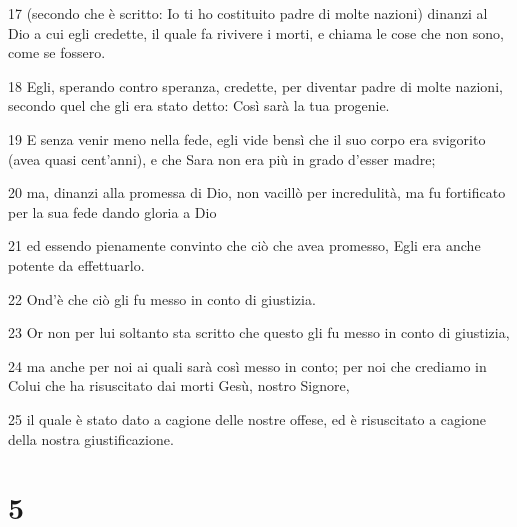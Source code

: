 \par 17 (secondo che è scritto: Io ti ho costituito padre di molte nazioni) dinanzi al Dio a cui egli credette, il quale fa rivivere i morti, e chiama le cose che non sono, come se fossero.
\par 18 Egli, sperando contro speranza, credette, per diventar padre di molte nazioni, secondo quel che gli era stato detto: Così sarà la tua progenie.
\par 19 E senza venir meno nella fede, egli vide bensì che il suo corpo era svigorito (avea quasi cent'anni), e che Sara non era più in grado d'esser madre;
\par 20 ma, dinanzi alla promessa di Dio, non vacillò per incredulità, ma fu fortificato per la sua fede dando gloria a Dio
\par 21 ed essendo pienamente convinto che ciò che avea promesso, Egli era anche potente da effettuarlo.
\par 22 Ond'è che ciò gli fu messo in conto di giustizia.
\par 23 Or non per lui soltanto sta scritto che questo gli fu messo in conto di giustizia,
\par 24 ma anche per noi ai quali sarà così messo in conto; per noi che crediamo in Colui che ha risuscitato dai morti Gesù, nostro Signore,
\par 25 il quale è stato dato a cagione delle nostre offese, ed è risuscitato a cagione della nostra giustificazione.

\chapter{5}

